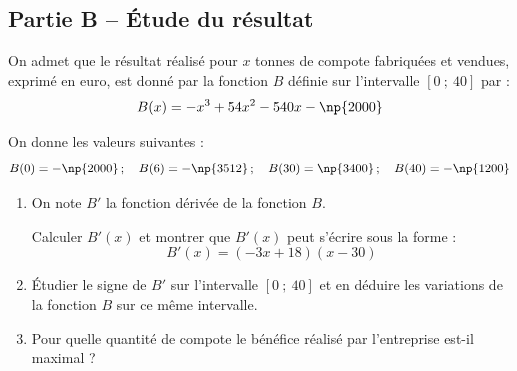 \subsection*{Partie B -- Étude du résultat}

On admet que le résultat réalisé pour $x$ tonnes de compote fabriquées et vendues, exprimé en euro, est donné par la fonction $B$ définie sur l'intervalle $[0~;~40]$ par :
\[ B(x) = -x^3+54x^2-540x-\np{2000} \]

On donne les valeurs suivantes :
\[B(0) = -\np{2000} \,;\quad B(6) = -\np{3512} \,;\quad B(30) = \np{3400} \,;\quad B(40) = -\np{1200}\]

\begin{enumerate}
	\item On note $B'$ la fonction dérivée de la fonction $B$.

	Calculer $B'(x)$ et montrer que $B'(x)$ peut s'écrire sous la forme :
	\[ B'(x) = (-3x + 18)(x - 30) \]
	\item Étudier le signe de $B'$ sur l'intervalle $[0~;~40]$ et en déduire les variations de la fonction $B$ sur ce même intervalle.
	\item Pour quelle quantité de compote le bénéfice réalisé par l'entreprise est-il maximal ?
\end{enumerate}

\medskip
